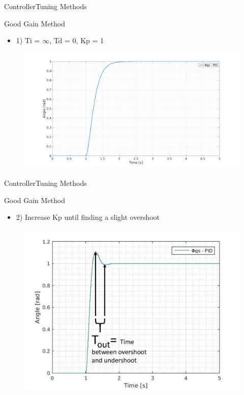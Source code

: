 \begin{frame}{Controller}{Tuning Methods}
  \begin{block}{Good Gain Method}
  
	  \begin{itemize}
	  	\item 1) Ti = $\infty$, Td = 0, Kp = 1
	  \end{itemize}
	  \begin{figure}
       \includegraphics[scale=0.20]{../report/figures/GG1.png}
      \end{figure}
  
  \end{block}
\end{frame}

\begin{frame}{Controller}{Tuning Methods}
  \begin{block}{Good Gain Method}
  
	  \begin{itemize}
	  	\item 2) Increase Kp until finding a slight overshoot
	  \end{itemize}
	  \begin{figure}
       \includegraphics[scale=0.26]{../report/figures/GGM1.png}
      \end{figure}
  
  \end{block}
\end{frame}


